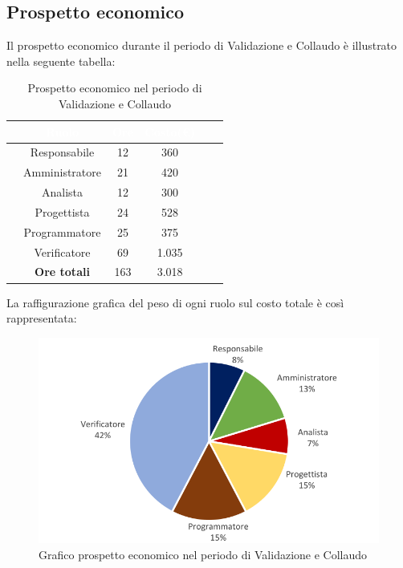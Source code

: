 \subsection{Prospetto economico}
Il prospetto economico durante il periodo di Validazione e Collaudo è illustrato nella seguente tabella:

\begin{table}[ht]
	\begin{center}
		\begin{tabular}{cccccc}
			\rowcolor{coolblack}
			\hline
			&\textcolor{white}{Ruolo}&	\textcolor{white}{Ore} &\textcolor{white}{Costo(\euro)} \\
			\hline
			&Responsabile           &12&360\\
			&Amministratore        & 21& 420 \\
			&Analista                   & 12& 300\\
			&Progettista              &  24& 528\\
			&Programmatore       & 25& 375 \\
			&Verificatore             & 69& 1.035\\
			\hline
			&\textbf{Ore totali}    &163&3.018\\
		\end{tabular}
		\caption{Prospetto economico nel periodo di Validazione e Collaudo}
	\end{center}
\end{table}

La raffigurazione grafica del peso di ogni ruolo sul costo totale è così rappresentata:
\begin{figure}[!ht]
	\begin{center}
		\includegraphics{images/grafoValidazioneCollaudoEuro.png}
		\caption{Grafico prospetto economico nel periodo di Validazione e Collaudo}
	\end{center}
\end{figure}
\newpage
